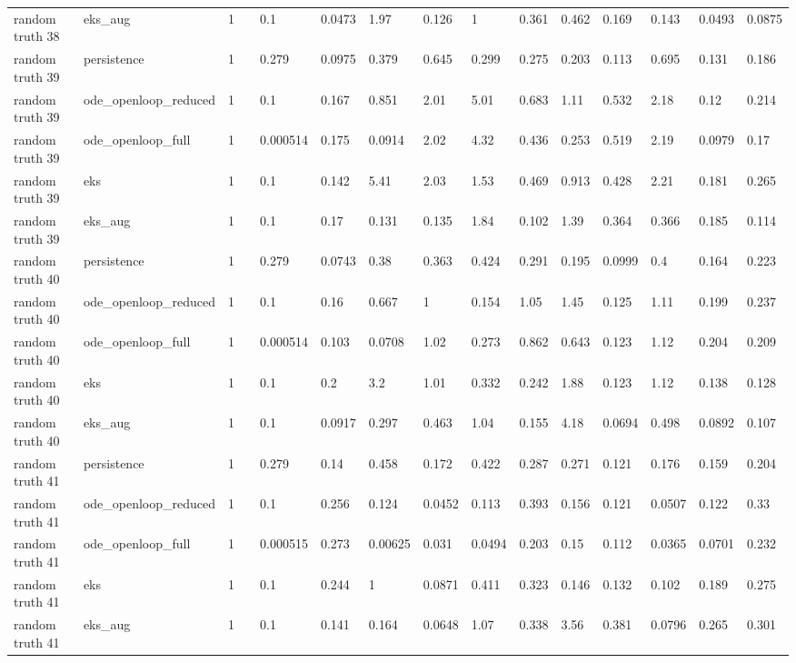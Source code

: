 \begin{table}[t]
\begin{tabular}{lllllllllllllll}
random truth 38 & eks\_aug & 1 &  & 0.1 & 0.0473 & 1.97 & 0.126 & 1 & 0.361 & 0.462 & 0.169 & 0.143 & 0.0493 & 0.0875 \\
random truth 39 & persistence & 1 &  & 0.279 & 0.0975 & 0.379 & 0.645 & 0.299 & 0.275 & 0.203 & 0.113 & 0.695 & 0.131 & 0.186 \\
random truth 39 & ode\_openloop\_reduced & 1 &  & 0.1 & 0.167 & 0.851 & 2.01 & 5.01 & 0.683 & 1.11 & 0.532 & 2.18 & 0.12 & 0.214 \\
random truth 39 & ode\_openloop\_full & 1 &  & 0.000514 & 0.175 & 0.0914 & 2.02 & 4.32 & 0.436 & 0.253 & 0.519 & 2.19 & 0.0979 & 0.17 \\
random truth 39 & eks & 1 &  & 0.1 & 0.142 & 5.41 & 2.03 & 1.53 & 0.469 & 0.913 & 0.428 & 2.21 & 0.181 & 0.265 \\
random truth 39 & eks\_aug & 1 &  & 0.1 & 0.17 & 0.131 & 0.135 & 1.84 & 0.102 & 1.39 & 0.364 & 0.366 & 0.185 & 0.114 \\
random truth 40 & persistence & 1 &  & 0.279 & 0.0743 & 0.38 & 0.363 & 0.424 & 0.291 & 0.195 & 0.0999 & 0.4 & 0.164 & 0.223 \\
random truth 40 & ode\_openloop\_reduced & 1 &  & 0.1 & 0.16 & 0.667 & 1 & 0.154 & 1.05 & 1.45 & 0.125 & 1.11 & 0.199 & 0.237 \\
random truth 40 & ode\_openloop\_full & 1 &  & 0.000514 & 0.103 & 0.0708 & 1.02 & 0.273 & 0.862 & 0.643 & 0.123 & 1.12 & 0.204 & 0.209 \\
random truth 40 & eks & 1 &  & 0.1 & 0.2 & 3.2 & 1.01 & 0.332 & 0.242 & 1.88 & 0.123 & 1.12 & 0.138 & 0.128 \\
random truth 40 & eks\_aug & 1 &  & 0.1 & 0.0917 & 0.297 & 0.463 & 1.04 & 0.155 & 4.18 & 0.0694 & 0.498 & 0.0892 & 0.107 \\
random truth 41 & persistence & 1 &  & 0.279 & 0.14 & 0.458 & 0.172 & 0.422 & 0.287 & 0.271 & 0.121 & 0.176 & 0.159 & 0.204 \\
random truth 41 & ode\_openloop\_reduced & 1 &  & 0.1 & 0.256 & 0.124 & 0.0452 & 0.113 & 0.393 & 0.156 & 0.121 & 0.0507 & 0.122 & 0.33 \\
random truth 41 & ode\_openloop\_full & 1 &  & 0.000515 & 0.273 & 0.00625 & 0.031 & 0.0494 & 0.203 & 0.15 & 0.112 & 0.0365 & 0.0701 & 0.232 \\
random truth 41 & eks & 1 &  & 0.1 & 0.244 & 1 & 0.0871 & 0.411 & 0.323 & 0.146 & 0.132 & 0.102 & 0.189 & 0.275 \\
random truth 41 & eks\_aug & 1 &  & 0.1 & 0.141 & 0.164 & 0.0648 & 1.07 & 0.338 & 3.56 & 0.381 & 0.0796 & 0.265 & 0.301 \\

\end{tabular}
\end{table}
